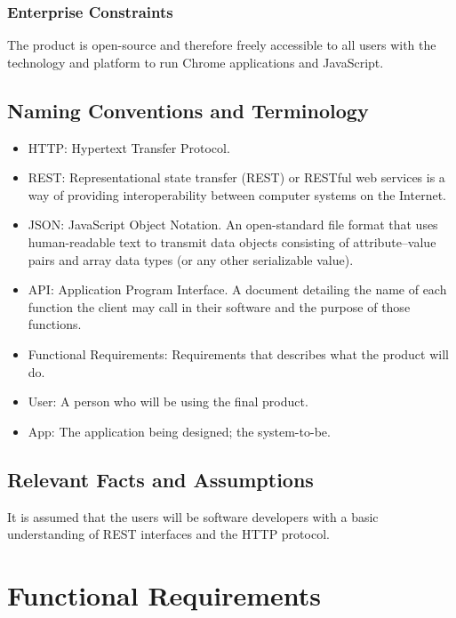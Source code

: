 \documentclass[12pt, titlepage]{article}
\begin{document}
\subsubsection{Enterprise Constraints}
The product is open-source and therefore freely accessible to all users with the technology and platform to run Chrome applications and JavaScript.

\subsection{Naming Conventions and Terminology}
\begin{itemize}
	\item HTTP: Hypertext Transfer Protocol.
	\item REST: Representational state transfer (REST) or RESTful web services is a way of providing interoperability between computer systems on the Internet.
	\item JSON: JavaScript Object Notation. An open-standard file format that uses human-readable text to transmit data objects consisting of attribute–value pairs and array data types (or any other serializable value).
	\item API: Application Program Interface. A document detailing the name of each function the client may call in their software and the purpose of those functions.
	\item Functional Requirements: Requirements that describes what the product will do.
	\item User: A person who will be using the final product.
	\item App: The application being designed; the system-to-be.
\end{itemize}


\subsection{Relevant Facts and Assumptions}
It is assumed that the users will be software developers with a basic understanding of REST interfaces and the HTTP protocol.

\newpage
\section{Functional Requirements}
\end{document}
